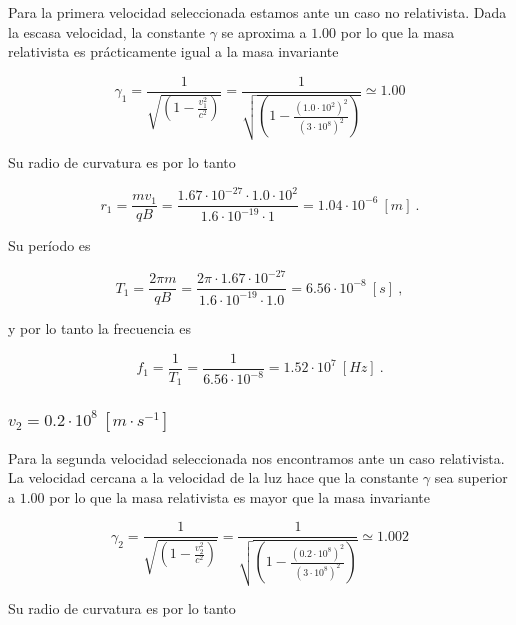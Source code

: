 \documentclass[journal]{IEEEtran}
\begin{document}
Para la primera velocidad seleccionada estamos ante un caso no relativista. Dada la escasa velocidad, la constante $\gamma$ se aproxima a $1.00$ por lo que la masa relativista es prácticamente igual a la masa invariante

\begin{equation}
\gamma_1 = \displaystyle\frac{1}{\sqrt{(1-\displaystyle\frac{v_1^2}{c^2})}} = \displaystyle\frac{1}{\sqrt{(1-\displaystyle\frac{(1.0\cdot 10^2)^2}{(3\cdot 10^8)^2})}} \simeq 1.00
\end{equation}

Su radio de curvatura es por lo tanto

\begin{equation}
r_1 = \displaystyle\frac{mv_1}{qB} = \displaystyle\frac{1.67\cdot 10^{-27}\cdot 1.0\cdot 10^2}{1.6\cdot 10^{-19}\cdot 1} = 1.04\cdot 10^{-6}~[m]~.
\end{equation}

Su período es

\begin{equation}
T_1 = \displaystyle\frac{2\pi m}{qB} = \displaystyle\frac{2\pi \cdot 1.67\cdot 10^{-27}}{1.6\cdot 10^{-19}\cdot 1.0} = 6.56\cdot 10^{-8}~[s]~,
\end{equation}

y por lo tanto la frecuencia es

\begin{equation}
f_1 = \displaystyle\frac{1}{T_1} = \displaystyle\frac{1}{6.56\cdot 10^{-8}} = 1.52\cdot 10^7~[Hz]~.
\end{equation}

\subsubsection{$v_2 = 0.2\cdot 10^8~[m\cdot s^{-1}]$}

Para la segunda velocidad seleccionada nos encontramos ante un caso relativista. La velocidad cercana a la velocidad de la luz hace que la constante $\gamma$ sea superior a $1.00$ por lo que la masa relativista es mayor que la masa invariante 

\begin{equation}
\gamma_2 = \displaystyle\frac{1}{\sqrt{(1-\displaystyle\frac{v_2^2}{c^2})}} = \displaystyle\frac{1}{\sqrt{(1-\displaystyle\frac{(0.2\cdot 10^8)^2}{(3\cdot 10^8)^2})}} \simeq 1.002
\end{equation}

Su radio de curvatura es por lo tanto
\end{document}
